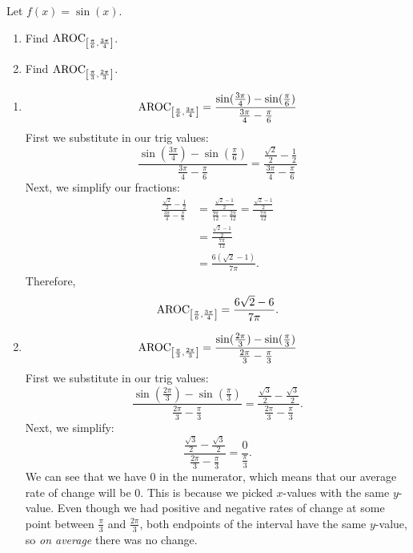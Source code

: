 \documentclass{ximera}
\begin{document}
\begin{example}
Let $f(x) =\sin(x)$.
\begin{enumerate}
\item Find $\mathrm{AROC}_{\left[\frac{\pi}{6},\frac{3\pi}{4}\right]} $.
\item Find $\mathrm{AROC}_{\left[\frac{\pi}{3},\frac{2\pi}{3}\right]} $.
\end{enumerate}
\begin{explanation}
\begin{enumerate}
\item $$\mathrm{AROC}_{\left[\frac{\pi}{6},\frac{3\pi}{4}\right]}  = \frac{\sin(\frac{3\pi}{4})-\sin(\frac{\pi}{6})}{\frac{3\pi}{4} - \frac{\pi}{6}}$$
First we substitute in our trig values:
$$\frac{\sin(\frac{3\pi}{4})-\sin(\frac{\pi}{6})}{\frac{3\pi}{4} - \frac{\pi}{6}}=\frac{\frac{\sqrt{2}}{2}-\frac{1}{2}}{\frac{3\pi}{4} - \frac{\pi}{6}}$$
Next, we simplify our fractions:
\begin{align*}
\frac{\frac{\sqrt{2}}{2}-\frac{1}{2}}{\frac{3\pi}{4} - \frac{\pi}{6}} & = \frac{\frac{\sqrt{2}-1}{2}}{\frac{9\pi}{12} - \frac{2\pi}{12}}= \frac{\frac{\sqrt{2}-1}{2}}{\frac{7\pi}{12}}\\
& = \frac{\frac{\sqrt{2}-1}{2}}{\frac{7\pi}{12}} \\
& =\frac{6(\sqrt{2}-1)}{7\pi}.
\end{align*}
Therefore, 
$$\mathrm{AROC}_{\left[\frac{\pi}{6},\frac{3\pi}{4}\right]} =\frac{6\sqrt{2}-6}{7\pi}.$$

\item $$\mathrm{AROC}_{\left[\frac{\pi}{3},\frac{2\pi}{3}\right]} = \frac{\sin(\frac{2\pi}{3})-\sin(\frac{\pi}{3})}{\frac{2\pi}{3} - \frac{\pi}{3}}$$
First we substitute in our trig values:
$$\frac{\sin(\frac{2\pi}{3})-\sin(\frac{\pi}{3})}{\frac{2\pi}{3} - \frac{\pi}{3}} = \frac{\frac{\sqrt{3}}{2}-\frac{\sqrt{3}}{2}}{\frac{2\pi}{3} - \frac{\pi}{3}}.$$
Next, we simplify:
$$\frac{\frac{\sqrt{3}}{2}-\frac{\sqrt{3}}{2}}{\frac{2\pi}{3} - \frac{\pi}{3}}=\frac{0}{\frac{\pi}{3}}.$$
We can see that we have $0$ in the numerator, which means that our average rate of change will be $0$. This is because we picked $x$-values with the same $y$-value. Even though we had positive and negative rates of change at some point between $\frac{\pi}{3}$ and $\frac{2\pi}{3}$, both endpoints of the interval have the same $y$-value, so \emph{on average} there was no change.
\end{enumerate}
\end{explanation}
\end{example}
\end{document}
